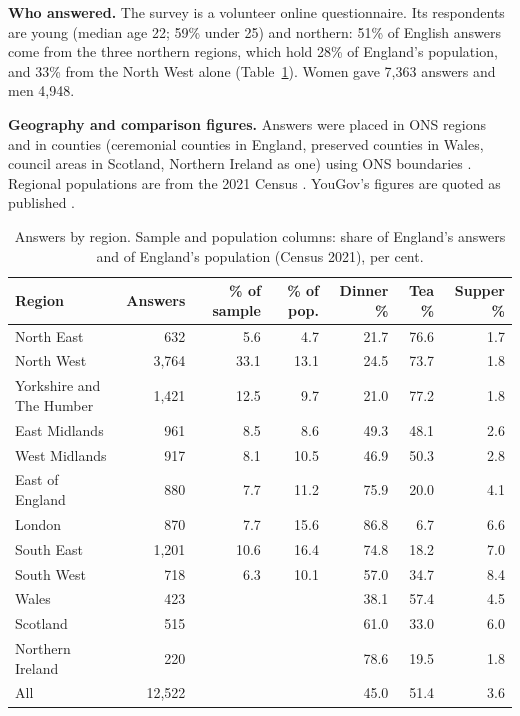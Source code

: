 \documentclass[11pt,a4paper]{article}
\begin{document}
\textbf{Who answered.} The survey is a volunteer online questionnaire. Its respondents are young (median age 22; 59\% under 25) and northern: 51\% of English answers come from the three northern regions, which hold 28\% of England's population, and 33\% from the North West alone (Table~\ref{tab:regions}). Women gave 7,363 answers and men 4,948.

\textbf{Geography and comparison figures.} Answers were placed in ONS regions and in counties (ceremonial counties in England, preserved counties in Wales, council areas in Scotland, Northern Ireland as one) using ONS boundaries \citep{ons_geo}. Regional populations are from the 2021 Census \citep{census}. YouGov's figures are quoted as published \citep{yougov}.

\begin{table}[tbp]\centering\small\caption{Answers by region. Sample and population columns: share of England's answers and of England's population (Census 2021), per cent.}\label{tab:regions}\begin{tabular}{lrrrrrr}\toprule Region & Answers & \% of sample & \% of pop. & Dinner \% & Tea \% & Supper \%\\\midrule
North East & 632 & 5.6 & 4.7 & 21.7 & 76.6 & 1.7\\
North West & 3,764 & 33.1 & 13.1 & 24.5 & 73.7 & 1.8\\
Yorkshire and The Humber & 1,421 & 12.5 & 9.7 & 21.0 & 77.2 & 1.8\\
East Midlands & 961 & 8.5 & 8.6 & 49.3 & 48.1 & 2.6\\
West Midlands & 917 & 8.1 & 10.5 & 46.9 & 50.3 & 2.8\\
East of England & 880 & 7.7 & 11.2 & 75.9 & 20.0 & 4.1\\
London & 870 & 7.7 & 15.6 & 86.8 & 6.7 & 6.6\\
South East & 1,201 & 10.6 & 16.4 & 74.8 & 18.2 & 7.0\\
South West & 718 & 6.3 & 10.1 & 57.0 & 34.7 & 8.4\\
Wales & 423 &  &  & 38.1 & 57.4 & 4.5\\
Scotland & 515 &  &  & 61.0 & 33.0 & 6.0\\
Northern Ireland & 220 &  &  & 78.6 & 19.5 & 1.8\\
\midrule All & 12,522 & & & 45.0 & 51.4 & 3.6\\\bottomrule\end{tabular}\end{table}
\end{document}
